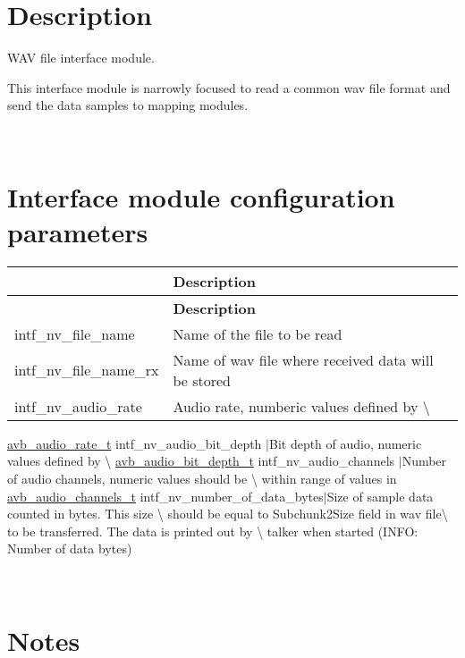 \section*{Description}

W\+AV file interface module.

This interface module is narrowly focused to read a common wav file format and send the data samples to mapping modules.

~\newline
 \section*{Interface module configuration parameters}

\tabulinesep=1mm
\begin{longtabu} spread 0pt [c]{*2{|X[-1]}|}
\hline
{}&{\bf Description  }\\
\endfirsthead
\hline
\endfoot
\hline
{}&{\bf Description  }\\
\endhead
intf\+\_\+nv\+\_\+file\+\_\+name &Name of the file to be read \\
intf\+\_\+nv\+\_\+file\+\_\+name\+\_\+rx &Name of wav file where received data will be stored \\
intf\+\_\+nv\+\_\+audio\+\_\+rate &Audio rate, numberic values defined by \textbackslash{} \\
\end{longtabu}
\hyperlink{openavb__audio__pub_8h_a6070f1cfbb6824de6f0b2524cd306903}{avb\+\_\+audio\+\_\+rate\+\_\+t} intf\+\_\+nv\+\_\+audio\+\_\+bit\+\_\+depth $\vert$\+Bit depth of audio, numeric values defined by \textbackslash{} \hyperlink{openavb__audio__pub_8h_ae64ee32f6ac9a6b2cf607f46ee4160bd}{avb\+\_\+audio\+\_\+bit\+\_\+depth\+\_\+t} intf\+\_\+nv\+\_\+audio\+\_\+channels $\vert$\+Number of audio channels, numeric values should be \textbackslash{} within range of values in \hyperlink{openavb__audio__pub_8h_a8cc6b9a1352da050ead620139f49acc4}{avb\+\_\+audio\+\_\+channels\+\_\+t} intf\+\_\+nv\+\_\+number\+\_\+of\+\_\+data\+\_\+bytes$\vert$\+Size of sample data counted in bytes. This size \textbackslash{} should be equal to Subchunk2\+Size field in wav file\textbackslash{} to be transferred. The data is printed out by \textbackslash{} talker when started (I\+N\+FO\+: Number of data bytes)

~\newline
 \section*{Notes}

